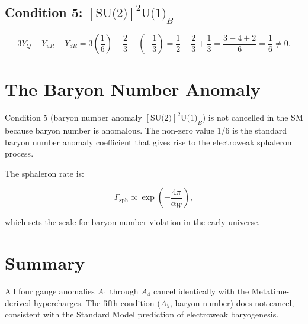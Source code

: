 \subsection*{Condition 5: \([\text{SU(2)}]^2\text{U(1)}_B\)}

\[
3Y_Q - Y_{uR} - Y_{dR}
= 3\!\left(\frac16\right) - \frac23 - \left(-\frac13\right)
= \frac12 - \frac23 + \frac13
= \frac{3 - 4 + 2}{6} = \frac16 \neq 0.
\]

\section{The Baryon Number Anomaly}

Condition 5 (baryon number anomaly \([\text{SU(2)}]^2\text{U(1)}_B\)) is
not cancelled in the SM because baryon number is anomalous.  The
non-zero value \(1/6\) is the standard baryon number anomaly coefficient
that gives rise to the electroweak sphaleron process.

The sphaleron rate is:

\[
\Gamma_{\text{sph}} \propto \exp\left(-\frac{4\pi}{\alpha_W}\right),
\]

which sets the scale for baryon number violation in the early universe.

\section{Summary}

All four gauge anomalies \(A_1\) through \(A_4\) cancel identically with
the Metatime-derived hypercharges.  The fifth condition (\(A_5\),
baryon number) does not cancel, consistent with the Standard Model
prediction of electroweak baryogenesis.
